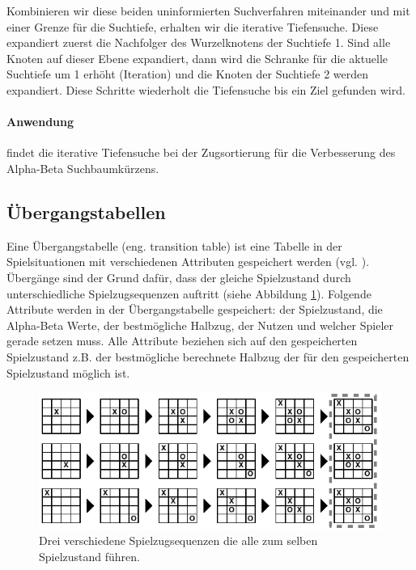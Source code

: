 Kombinieren wir diese beiden uninformierten Suchverfahren miteinander und mit einer Grenze für die Suchtiefe, erhalten wir die iterative Tiefensuche. Diese expandiert zuerst die Nachfolger des Wurzelknotens der Suchtiefe 1. Sind alle Knoten auf dieser Ebene expandiert, dann wird die Schranke für die aktuelle Suchtiefe um 1 erhöht (Iteration) und die Knoten der Suchtiefe 2 werden expandiert. Diese Schritte wiederholt die Tiefensuche bis ein Ziel gefunden wird.  

\paragraph{Anwendung} findet die iterative Tiefensuche bei der Zugsortierung für die Verbesserung des Alpha-Beta Suchbaumkürzens. 


\subsection{Übergangstabellen}
\label{subsection:Übergangstabellen}
Eine Übergangstabelle (eng. transition table) ist eine Tabelle in der Spielsituationen mit verschiedenen Attributen gespeichert werden (vgl. \cite[215\psq]{Russell}). Übergänge sind der Grund dafür, dass der gleiche Spielzustand durch unterschiedliche Spielzugsequenzen auftritt (siehe Abbildung \ref{fig:transitionen_tictactoe}). Folgende Attribute werden in der Übergangstabelle gespeichert: der Spielzustand, die Alpha-Beta Werte, der bestmögliche Halbzug, der Nutzen und welcher Spieler gerade setzen muss. Alle Attribute beziehen sich auf den gespeicherten Spielzustand z.B. der bestmögliche berechnete Halbzug der für den gespeicherten Spielzustand möglich ist. \\

\begin{figure}[!htbp]
  \centering
  \includegraphics{inhalt/abbildungen/transitionen_tictactoe.pdf}
  \caption{Drei verschiedene Spielzugsequenzen die alle zum selben Spielzustand führen.}
  \label{fig:transitionen_tictactoe}
\end{figure} 

